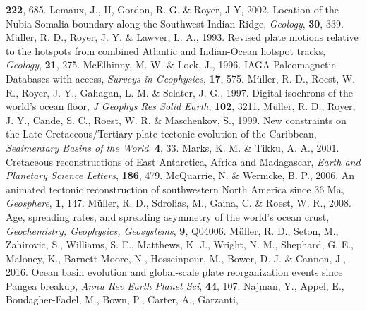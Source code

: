 \begin{thebibliography}{}
  \textbf{222}, 685.
  Lemaux, J., II, Gordon, R. G. \& Royer, J-Y, 2002. Location of the
  Nubia-Somalia boundary along the Southwest Indian Ridge, \textit{Geology},
  \textbf{30}, 339.
  M{\"{u}}ller, R. D., Royer, J. Y. \& Lawver, L. A., 1993. Revised plate
  motions relative to the hotspots from combined Atlantic and Indian-Ocean
  hotspot tracks, \textit{Geology}, \textbf{21}, 275.
  McElhinny, M. W. \& Lock, J., 1996. IAGA Paleomagnetic Databases with access,
  \textit{Surveys in Geophysics}, \textbf{17}, 575.
  M{\"{u}}ller, R. D., Roest, W. R., Royer, J. Y., Gahagan, L. M. \& Sclater,
  J. G., 1997. Digital isochrons of the world's ocean floor, \textit{J Geophys
  Res Solid Earth}, \textbf{102}, 3211.
  M{\"{u}}ller, R. D., Royer, J. Y., Cande, S. C., Roest, W. R. \& Maschenkov,
  S., 1999. New constraints on the Late Cretaceous/Tertiary plate tectonic
  evolution of the Caribbean, \textit{Sedimentary Basins of the World}.
  \textbf{4}, 33.
  Marks, K. M. \& Tikku, A. A., 2001. Cretaceous reconstructions of East
  Antarctica, Africa and Madagascar, \textit{Earth and Planetary Science
  Letters}, \textbf{186}, 479.
  McQuarrie, N. \& Wernicke, B. P., 2006. An animated tectonic reconstruction of
  southwestern North America since 36 Ma, \textit{Geosphere}, \textbf{1},
  147.
  M{\"{u}}ller, R. D., Sdrolias, M., Gaina, C. \& Roest, W. R., 2008. Age,
  spreading rates, and spreading asymmetry of the world's ocean crust,
  \textit{Geochemistry, Geophysics, Geosystems}, \textbf{9}, Q04006.
  M{\"{u}}ller, R. D., Seton, M., Zahirovic, S., Williams, S. E., Matthews, K.
  J., Wright, N. M., Shephard, G. E., Maloney, K., Barnett-Moore, N.,
  Hosseinpour, M., Bower, D. J. \& Cannon, J., 2016. Ocean basin evolution and
  global-scale plate reorganization events since Pangea breakup, \textit{Annu
  Rev Earth Planet Sci}, \textbf{44}, 107.
  Najman, Y., Appel, E., Boudagher-Fadel, M., Bown, P., Carter, A., Garzanti,

\end{thebibliography}
